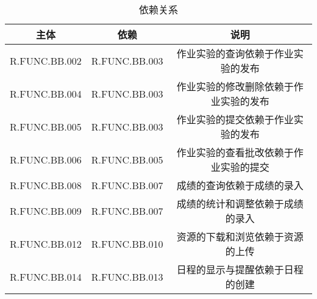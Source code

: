 \begin{table}[htbp]
\centering
\caption{依赖关系}
\begin{tabular}{|c|c|c|}
    \hline
    主体 & 依赖 & 说明 \\
    \hline
    R.FUNC.BB.002 & R.FUNC.BB.003 & 作业实验的查询依赖于作业实验的发布 \\
    \hline
    R.FUNC.BB.004 & R.FUNC.BB.003 & 作业实验的修改删除依赖于作业实验的发布\\
    \hline
    R.FUNC.BB.005 & R.FUNC.BB.003 & 作业实验的提交依赖于作业实验的发布\\
    \hline
    R.FUNC.BB.006 & R.FUNC.BB.005 & 作业实验的查看批改依赖于作业实验的提交\\
    \hline
    R.FUNC.BB.008 & R.FUNC.BB.007 & 成绩的查询依赖于成绩的录入\\
    \hline
    R.FUNC.BB.009 & R.FUNC.BB.007 & 成绩的统计和调整依赖于成绩的录入\\
    \hline
    R.FUNC.BB.012 & R.FUNC.BB.010 & 资源的下载和浏览依赖于资源的上传\\
    \hline
    R.FUNC.BB.014 & R.FUNC.BB.013 & 日程的显示与提醒依赖于日程的创建\\
    \hline
\end{tabular}
\end{table}
